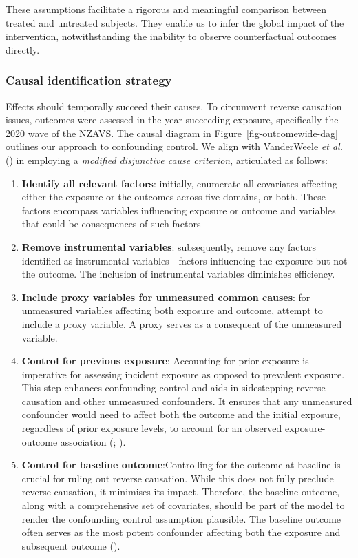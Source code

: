 \documentclass[
  singlecolumn,
  9pt]{article}
\begin{document}
These assumptions facilitate a rigorous and meaningful comparison
between treated and untreated subjects. They enable us to infer the
global impact of the intervention, notwithstanding the inability to
observe counterfactual outcomes directly.

\subsubsection{Causal identification
strategy}\label{causal-identification-strategy}

Effects should temporally succeed their causes. To circumvent reverse
causation issues, outcomes were assessed in the year succeeding
exposure, specifically the 2020 wave of the NZAVS. The causal diagram in
Figure~\ref{fig-outcomewide-dag} outlines our approach to confounding
control. We align with VanderWeele \emph{et al.}
() in employing a \emph{modified
disjunctive cause criterion}, articulated as follows:

\begin{enumerate}
\def\labelenumi{\arabic{enumi}.}
\item
  \textbf{Identify all relevant factors}: initially, enumerate all
  covariates affecting either the exposure or the outcomes across five
  domains, or both. These factors encompass variables influencing
  exposure or outcome and variables that could be consequences of such
  factors
\item
  \textbf{Remove instrumental variables}: subsequently, remove any
  factors identified as instrumental variables---factors influencing the
  exposure but not the outcome. The inclusion of instrumental variables
  diminishes efficiency.
\item
  \textbf{Include proxy variables for unmeasured common causes}: for
  unmeasured variables affecting both exposure and outcome, attempt to
  include a proxy variable. A proxy serves as a consequent of the
  unmeasured variable.
\item
  \textbf{Control for previous exposure}: Accounting for prior exposure
  is imperative for assessing incident exposure as opposed to prevalent
  exposure. This step enhances confounding control and aids in
  sidestepping reverse causation and other unmeasured confounders. It
  ensures that any unmeasured confounder would need to affect both the
  outcome and the initial exposure, regardless of prior exposure levels,
  to account for an observed exposure-outcome association
  (;
  ).
\item
  \textbf{Control for baseline outcome}:Controlling for the outcome at
  baseline is crucial for ruling out reverse causation. While this does
  not fully preclude reverse causation, it minimises its impact.
  Therefore, the baseline outcome, along with a comprehensive set of
  covariates, should be part of the model to render the confounding
  control assumption plausible. The baseline outcome often serves as the
  most potent confounder affecting both the exposure and subsequent
  outcome ().
\end{enumerate}
\end{document}
